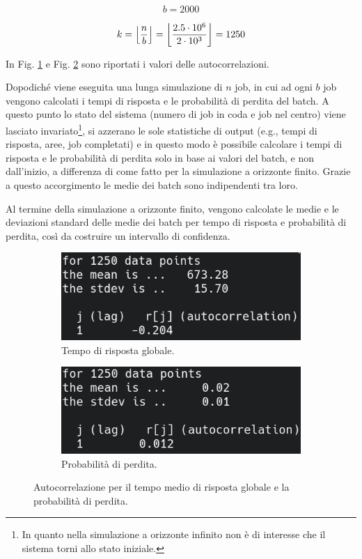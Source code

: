 \documentclass{article}
\DeclarePairedDelimiter\floor{\lfloor}{\rfloor}
\begin{document}
\[b = 2000\]

\[k = \floor*{\frac{n}{b}} = \floor*{\frac{2.5 \cdot 10^{6}}{2 \cdot 10^{3}}} = 1250\]

In Fig. \ref{fig:auto_grt} e Fig. \ref{fig:auto_ploss} sono riportati i valori delle autocorrelazioni. 

Dopodiché viene eseguita una lunga simulazione di \(n\) job, in cui ad ogni \(b\) job vengono calcolati i tempi di risposta e le probabilità di perdita del batch. A questo punto lo stato del sistema (numero di job in coda e job nel centro) viene lasciato invariato\footnote{In quanto nella simulazione a orizzonte infinito non è di interesse che il sistema torni allo stato iniziale.}, si azzerano le sole statistiche di output (e.g., tempi di risposta, aree, job completati) e in questo modo è possibile calcolare i tempi di risposta e le probabilità di perdita solo in base ai valori del batch, e non dall'inizio, a differenza di come fatto per la simulazione a orizzonte finito. Grazie a questo accorgimento le medie dei batch sono indipendenti tra loro.

Al termine della simulazione a orizzonte finito, vengono calcolate le medie e le deviazioni standard delle medie dei batch per tempo di risposta e probabilità di perdita, così da costruire un intervallo di confidenza.

\begin{figure}[h]
\begin{subfigure}{.5\textwidth}
  \centering
  \includegraphics[width=.75\linewidth]{img/auto_grt.png}
  \caption{Tempo di risposta globale.}
  \label{fig:auto_grt}
\end{subfigure}%
\begin{subfigure}{.5\textwidth}
  \centering
  \includegraphics[width=.75\linewidth]{img/auto_ploss.png}
  \caption{Probabilità di perdita.}
  \label{fig:auto_ploss}
\end{subfigure}
\caption{Autocorrelazione per il tempo medio di risposta globale e la probabilità di perdita.}
\label{fig:output_autocorrelazione}
\end{figure}
\FloatBarrier
\end{document}
